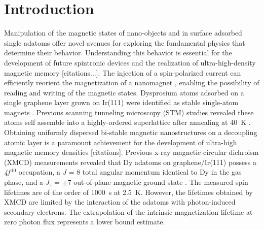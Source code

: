 \documentclass[
reprint,amsmath,amssymb,aps]{revtex4-2}
\begin{document}
\section{Introduction}
Manipulation of the magnetic states of nano-objects and in surface adsorbed single adatoms offer novel avenues for exploring the fundamental physics that determine their behavior. Understanding this behavior is essential for the development of future spintronic devices and the realization of ultra-high-density magnetic memory [citations...]. The injection of a spin-polarized current can efficiently reorient the magnetization of a nanomagnet \citep{Khajetoorians2013,krause_joule_2011,loth2010}, enabling the possibility of reading and writing of the magnetic states.
Dysprosium atoms adsorbed on a single graphene layer grown on Ir(111) were identified as stable single-atom magnets \citep{baltic2016}. Previous scanning tunneling microscopy (STM) studies revealed these atoms self assemble into a highly-ordered superlattice after annealing at 40~K \citep{baltic2016,pivetta2018}. Obtaining uniformly dispersed bi-stable magnetic nanostructures on a decoupling atomic layer is a paramount achievement for the development of ultra-high magnetic memory densities [citations]. Previous x-ray magnetic circular dichroism (XMCD) measurements revealed that Dy adatoms on graphene/Ir(111) possess a \textit{4f$^{\:10}$} occupation, a \textit{J} = 8 total angular momentum identical to Dy in the gas phase, and a \textit{J$_z$} = $\pm$7 out-of-plane magnetic ground state \citep{baltic2016,baltic2018}.
The measured spin lifetimes are of the order of 1000~s at 2.5~K.
However, the lifetimes obtained by XMCD are limited by the interaction of the adatoms with photon-induced secondary electrons. The extrapolation of the intrinsic magnetization lifetime at zero photon flux represents a lower bound estimate.
\end{document}
